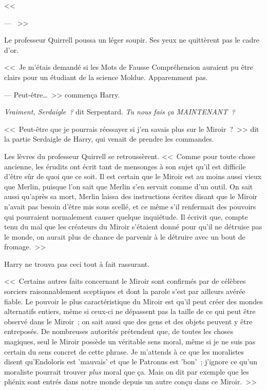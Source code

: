 <<~

--- ~>>

Le professeur Quirrell poussa un léger soupir. Ses yeux ne quittèrent pas le cadre d'or.

<<~Je m'étais demandé si les Mots de Fausse Compréhension auraient pu être clairs pour un étudiant de la science Moldue. Apparemment pas.

--- Peut-être…~>> commença Harry.

\emph{Vraiment, Serdaigle~?} dit Serpentard. \emph{Tu nous fais ça MAINTENANT~?}

<<~Peut-être que je pourrais réessayer si j'en savais plus sur le Miroir~?~>> dit la partie Serdaigle de Harry, qui venait de prendre les commandes.

Les lèvres du professeur Quirrell se retroussèrent. <<~Comme pour toute chose ancienne, les érudits ont écrit tant de mensonges à son sujet qu'il est difficile d'être sûr de quoi que ce soit. Il est certain que le Miroir est au moins aussi vieux que Merlin, puisque l'on sait que Merlin s'en servait comme d'un outil. On sait aussi qu'après sa mort, Merlin laissa des instructions écrites disant que le Miroir n'avait pas besoin d'être mis sous scellé, et ce même s'il renfermait des pouvoirs qui pourraient normalement causer quelque inquiétude. Il écrivit que, compte tenu du mal que les créateurs du Miroir s'étaient donné pour qu'il ne détruise pas le monde, on aurait plus de chance de parvenir à le détruire avec un bout de fromage.~>>

Harry ne trouva pas ceci tout à fait rassurant.

<<~Certains autres faits concernant le Miroir sont confirmés par de célèbres sorciers raisonnablement sceptiques et dont la parole s'est par ailleurs avérée fiable. Le pouvoir le plus caractéristique du Miroir est qu'il peut créer des mondes alternatifs entiers, même si ceux-ci ne dépassent pas la taille de ce qui peut être observé dans le Miroir~; on sait aussi que des gens et des objets peuvent y être entreposés. De nombreuses autorités prétendent que, de toutes les choses magiques, seul le Miroir possède un véritable sens moral, même si je ne suis pas certain du sens concret de cette phrase. Je m'attends à ce que les moralistes disent qu'Endoloris est 'mauvais' et que le Patronus est 'bon'~; j'ignore ce qu'un moraliste pourrait trouver \emph{plus} moral que ça. Mais on dit par exemple que les phénix sont entrés dans notre monde depuis un autre conçu dans ce Miroir.~>>


